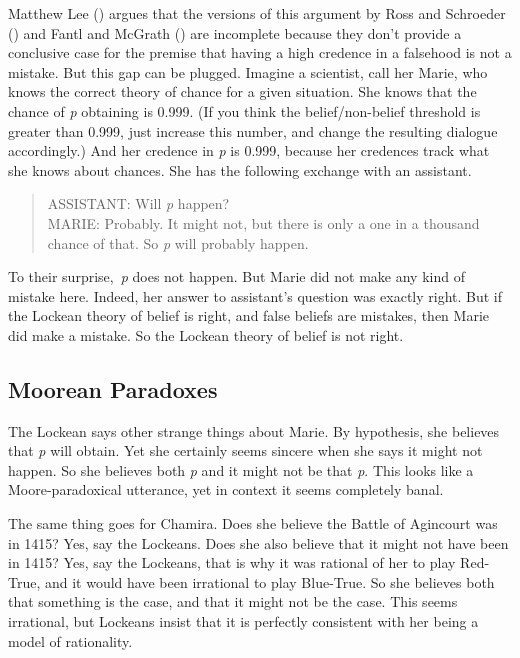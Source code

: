 \documentclass[
  12pt,
  letterpaper,
]{scrbook}
\begin{document}
Matthew Lee () argues that the versions of
this argument by Ross and Schroeder
() and Fantl and McGrath
() are incomplete because they
don't provide a conclusive case for the premise that having a high
credence in a falsehood is not a mistake. But this gap can be plugged.
Imagine a scientist, call her Marie, who knows the correct theory of
chance for a given situation. She knows that the chance of \emph{p}
obtaining is 0.999. (If you think the belief/non-belief threshold is
greater than 0.999, just increase this number, and change the resulting
dialogue accordingly.) And her credence in \emph{p} is 0.999, because
her credences track what she knows about chances. She has the following
exchange with an assistant.

\begin{quote}
ASSISTANT: Will \emph{p} happen?\\
MARIE: Probably. It might not, but there is only a one in a thousand
chance of that. So \emph{p} will probably happen.
\end{quote}

To their surprise,~\emph{p} does not happen. But Marie did not make any
kind of mistake here. Indeed, her answer to assistant's question was
exactly right. But if the Lockean theory of belief is right, and false
beliefs are mistakes, then Marie did make a mistake. So the Lockean
theory of belief is not right.

\subsection{Moorean Paradoxes}\label{sec-lockemoore}

The Lockean says other strange things about Marie. By hypothesis, she
believes that \emph{p} will obtain. Yet she certainly seems sincere when
she says it might not happen. So she believes both \emph{p} and it might
not be that \emph{p}. This looks like a Moore-paradoxical utterance, yet
in context it seems completely banal.

The same thing goes for Chamira. Does she believe the Battle of
Agincourt was in 1415? Yes, say the Lockeans. Does she also believe that
it might not have been in 1415? Yes, say the Lockeans, that is why it
was rational of her to play Red-True, and it would have been irrational
to play Blue-True. So she believes both that something is the case, and
that it might not be the case. This seems irrational, but Lockeans
insist that it is perfectly consistent with her being a model of
rationality.
\end{document}
